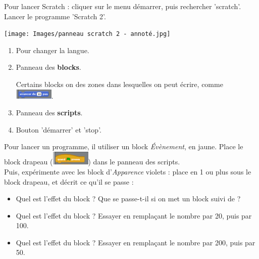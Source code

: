 \documentclass[a4paper,11pt]{article}
\newcommand{\exerciceSpacing}{2em}
\begin{document}
\begin{center}
	\LARGE
\end{center}

\begin{greybox}[frametitle={Pour commencer}]
	Pour lancer Scratch : cliquer sur le menu démarrer, puis rechercher 'scratch'. Lancer le programme 'Scratch 2'. \vspace{1em}

	\texttt{[image: Images/panneau scratch 2 - annoté.jpg]}

	\begin{enumerate}
		\item Pour changer la langue.
		\item Panneau des \textbf{blocks}.

		      Certains blocks on des zones dans lesquelles on peut écrire, comme \includegraphics[width=5em]{Images/Block avancer de 10 pas.png}.
		\item Panneau des \textbf{scripts}.
		\item Bouton 'démarrer' et 'stop'.
	\end{enumerate}
\end{greybox}

\vspace{\exerciceSpacing}

\begin{exercice}
	Pour lancer un programme, il  utiliser un block \textit{Évènement}, en jaune. Place le block drapeau (\includegraphics[width=5em]{Images/Block drapeau.png}) dans le panneau des scripts. \\

	Puis, expérimente avec les block d'\textit{Apparence} violets : place en 1 ou plus sous le block drapeau, et décrit ce qu'il se passe :
	\begin{itemize}
		\item Quel est l'effet du block  ? Que se passe-t-il si on met un block  suivi de  ? \vspace{0.5em}

		      \dotfill
		\item Quel est l'effet du block  ? Essayer en remplaçant le nombre par 20, puis par 100. \vspace{0.5em}

		      \dotfill
		\item Quel est l'effet du block  ? Essayer en remplaçant le nombre par 200, puis par 50. \vspace{0.5em}

		      \dotfill
	\end{itemize}
\end{exercice}
\end{document}
